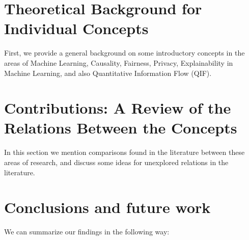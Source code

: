 \documentclass[conference]{IEEEtran}
\begin{document}
\section{Theoretical Background for Individual Concepts}\label{sec:theoRef1}

First, we provide a general background on some introductory concepts in the areas of Machine Learning, Causality, Fairness, Privacy, Explainability in Machine Learning, and also Quantitative Information Flow (QIF).



\section{Contributions: A Review of the Relations Between the Concepts}\label{sec:theoRef2}

In this section we mention comparisons found in the literature between these areas of research, and discuss some ideas for unexplored relations in the literature.



\section{Conclusions and future work}\label{sec:concsFuture}

We can summarize our findings in the following way:
\end{document}
